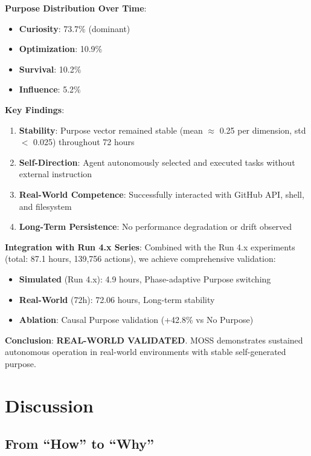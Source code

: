 \documentclass{article}
\begin{document}
\textbf{Purpose Distribution Over Time}:
\begin{itemize}
    \item \textbf{Curiosity}: 73.7\% (dominant)
    \item \textbf{Optimization}: 10.9\%
    \item \textbf{Survival}: 10.2\%
    \item \textbf{Influence}: 5.2\%
\end{itemize}

\textbf{Key Findings}:
\begin{enumerate}
    \item \textbf{Stability}: Purpose vector remained stable (mean $\approx$ 0.25 per dimension, std $<$ 0.025) throughout 72 hours
    \item \textbf{Self-Direction}: Agent autonomously selected and executed tasks without external instruction
    \item \textbf{Real-World Competence}: Successfully interacted with GitHub API, shell, and filesystem
    \item \textbf{Long-Term Persistence}: No performance degradation or drift observed
\end{enumerate}

\textbf{Integration with Run 4.x Series}:
Combined with the Run 4.x experiments (total: 87.1 hours, 139,756 actions), we achieve comprehensive validation:
\begin{itemize}
    \item \textbf{Simulated} (Run 4.x): 4.9 hours, Phase-adaptive Purpose switching
    \item \textbf{Real-World} (72h): 72.06 hours, Long-term stability
    \item \textbf{Ablation}: Causal Purpose validation (+42.8\% vs No Purpose)
\end{itemize}

\textbf{Conclusion}: \textbf{REAL-WORLD VALIDATED}. MOSS demonstrates sustained autonomous operation in real-world environments with stable self-generated purpose.

\section{Discussion}

\subsection{From ``How'' to ``Why''}
\end{document}
